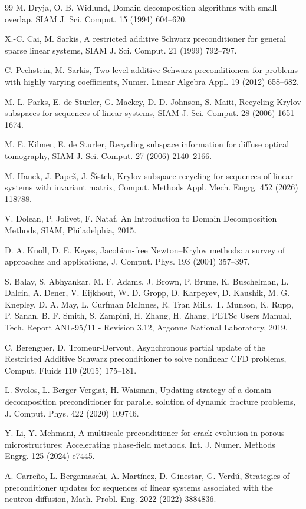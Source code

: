\documentclass[preprint,12pt,3p]{elsarticle}
\begin{document}
\begin{thebibliography}{99}
M. Dryja, O. B. Widlund,
Domain decomposition algorithms with small overlap,
SIAM J. Sci. Comput. 15 (1994) 604--620.

X.-C. Cai, M. Sarkis,
A restricted additive Schwarz preconditioner for general sparse linear systems,
SIAM J. Sci. Comput. 21 (1999) 792--797.

C. Pechstein, M. Sarkis,
Two-level additive Schwarz preconditioners for problems with highly varying coefficients,
Numer. Linear Algebra Appl. 19 (2012) 658--682.

M. L. Parks, E. de Sturler, G. Mackey, D. D. Johnson, S. Maiti,
Recycling Krylov subspaces for sequences of linear systems,
SIAM J. Sci. Comput. 28 (2006) 1651--1674.

M. E. Kilmer, E. de Sturler,
Recycling subspace information for diffuse optical tomography,
SIAM J. Sci. Comput. 27 (2006) 2140--2166.

M. Hanek, J. Pape{\v{z}}, J. {\v{S}}{\'\i}stek,
Krylov subspace recycling for sequences of linear systems with invariant matrix,
Comput. Methods Appl. Mech. Engrg. 452 (2026) 118788.

V. Dolean, P. Jolivet, F. Nataf,
An Introduction to Domain Decomposition Methods,
SIAM, Philadelphia, 2015.

D. A. Knoll, D. E. Keyes,
Jacobian-free Newton--Krylov methods: a survey of approaches and applications,
J. Comput. Phys. 193 (2004) 357--397.

S. Balay, S. Abhyankar, M. F. Adams, J. Brown, P. Brune, K. Buschelman, L. Dalcin, A. Dener, V. Eijkhout, W. D. Gropp, D. Karpeyev, D. Kaushik, M. G. Knepley, D. A. May, L. Curfman McInnes, R. Tran Mills, T. Munson, K. Rupp, P. Sanan, B. F. Smith, S. Zampini, H. Zhang, H. Zhang,
PETSc Users Manual,
Tech. Report ANL-95/11 - Revision 3.12, Argonne National Laboratory, 2019.

C. Berenguer, D. Tromeur-Dervout,
Asynchronous partial update of the Restricted Additive Schwarz preconditioner to solve nonlinear CFD problems,
Comput. Fluids 110 (2015) 175--181.

L. Svolos, L. Berger-Vergiat, H. Waisman,
Updating strategy of a domain decomposition preconditioner for parallel solution of dynamic fracture problems,
J. Comput. Phys. 422 (2020) 109746.

Y. Li, Y. Mehmani,
A multiscale preconditioner for crack evolution in porous microstructures: Accelerating phase-field methods,
Int. J. Numer. Methods Engrg. 125 (2024) e7445.

A. Carre\~{n}o, L. Bergamaschi, A. Mart\'inez, D. Ginestar, G. Verd\'u,
Strategies of preconditioner updates for sequences of linear systems associated with the neutron diffusion,
Math. Probl. Eng. 2022 (2022) 3884836.

\end{thebibliography}
\end{document}
